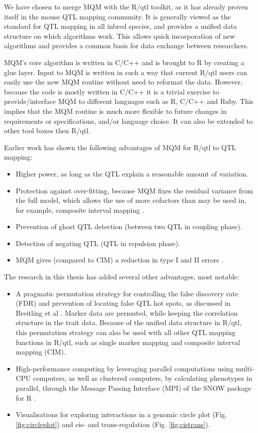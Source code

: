 We have chosen to merge MQM with the R/qtl toolkit, as it has already proven itself in the mouse QTL mapping community. It is generally 
viewed as the standard for QTL mapping in all inbred species, and provides a unified data structure on which algorithms work. This 
allows quick incorporation of new algorithms and provides a common basis for data exchange between researchers. 

MQM's core algorithm is written in C/C++ and is brought to R by creating a glue layer. Input to MQM is written in such a way that current 
R/qtl users can easily use the new MQM routine without need to reformat the data. However, because the code is mostly written in C/C++  
it is a trivial exercise to provide/interface MQM to different languages such as R, C/C++ and Ruby. This implies that the MQM routine is 
much more flexible to future changes in requirements or specifications, and/or language choice. It can also be extended to other tool 
boxes then R/qtl.

Earlier work has shown the following advantages of MQM for R/qtl to QTL mapping\cite{Jansen:1993, Handbook:Jansen:2007}: 

\begin{itemize}\itemsep1pt
\item Higher power, as long as the QTL explain a reasonable amount of variation.
\item Protection against over-fitting, because MQM fixes the residual variance from the full model, which allows the use of more cofactors than may be used in, for example, composite interval mapping \cite{Zeng:1994}.
\item Prevention of ghost QTL detection (between two QTL in coupling phase).
\item Detection of negating QTL (QTL in repulsion phase).
\item MQM gives (compared to CIM) a reduction in type I and II errors \cite{Handbook:Jansen:2007}.
\end{itemize}

The research in this thesis has added several other advantages, most notable:

\begin{itemize}\itemsep1pt
\item A pragmatic permutation strategy for controlling the false discovery rate (FDR) and prevention of locating false QTL hot 
spots, as discussed in Breitling et al \cite{Breitling:2008a}. Marker data are permuted, while keeping the correlation structure in the trait 
data. Because of the unified data structure in R/qtl, this permutation strategy can also be used with all other QTL mapping 
functions in R/qtl, such as single marker mapping and composite interval mapping (CIM).
\item High-performance computing by leveraging parallel computations using multi-CPU computers, as well as clustered computers, 
by calculating phenotypes in parallel, through the Message Passing Interface (MPI) of the SNOW package for R \cite{Tierney:2009}.
\item Visualisations for exploring interactions in a genomic circle plot (Fig. \ref{fig:circleplot}) and cis- and trans-regulation (Fig. \ref{fig:cistrans}).
\end{itemize}

